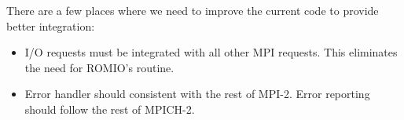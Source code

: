 \documentclass{article}
\begin{document}
There are a few places where we need to improve the current code to provide
better integration:
\begin{itemize}
\item I/O requests must be integrated with all other MPI requests.  This
  eliminates the need for ROMIO's  routine.
\item Error handler should consistent with the rest of MPI-2.  Error reporting
  should follow the rest of MPICH-2.
\end{itemize}

\end{document}
